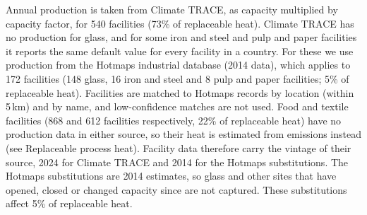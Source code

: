 \documentclass[11pt]{article}
\begin{document}
Annual production is taken from Climate TRACE, as capacity multiplied by capacity factor, for 540 facilities (73\% of replaceable heat). Climate TRACE has no production for glass, and for some iron and steel and pulp and paper facilities it reports the same default value for every facility in a country. For these we use production from the Hotmaps industrial database\cite{hotmaps2018} (2014 data), which applies to 172 facilities (148 glass, 16 iron and steel and 8 pulp and paper facilities; 5\% of replaceable heat). Facilities are matched to Hotmaps records by location (within 5\,km) and by name, and low-confidence matches are not used. Food and textile facilities (868 and 612 facilities respectively, 22\% of replaceable heat) have no production data in either source, so their heat is estimated from emissions instead (see Replaceable process heat). Facility data therefore carry the vintage of their source, 2024 for Climate TRACE and 2014 for the Hotmaps substitutions. The Hotmaps substitutions are 2014 estimates, so glass and other sites that have opened, closed or changed capacity since are not captured. These substitutions affect 5\% of replaceable heat.
\end{document}
